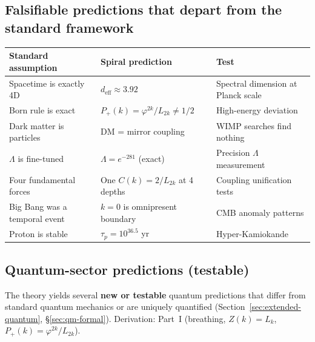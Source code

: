\documentclass[12pt,a4paper]{article}
\begin{document}
\subsection{Falsifiable predictions that depart from the standard framework}

\begin{center}\small
\begin{tabular}{|p{3.4cm}|p{4.2cm}|p{3.6cm}|}
\hline
\textbf{Standard assumption} & \textbf{Spiral prediction} & \textbf{Test} \\
\hline
Spacetime is exactly 4D & $d_{\mathrm{eff}} \approx 3.92$ & Spectral dimension at Planck scale \\
Born rule is exact & $P_+(k) = \varphi^{2k}/L_{2k} \neq 1/2$ & High-energy deviation \\
Dark matter is particles & DM = mirror coupling & WIMP searches find nothing \\
$\Lambda$ is fine-tuned & $\Lambda = e^{-281}$ (exact) & Precision $\Lambda$ measurement \\
Four fundamental forces & One $C(k)=2/L_{2k}$ at 4 depths & Coupling unification tests \\
Big Bang was a temporal event & $k=0$ is omnipresent boundary & CMB anomaly patterns \\
Proton is stable & $\tau_p = 10^{36.5}$ yr & Hyper-Kamiokande \\
\hline
\end{tabular}
\end{center}

\subsection{Quantum-sector predictions (testable)}
\label{sec:quantum-predictions}

The theory yields several \textbf{new or testable} quantum predictions that differ from standard quantum mechanics or are uniquely quantified (Section~\ref{sec:extended-quantum}, \S\ref{sec:qm-formal}). Derivation: Part~I (breathing, $Z(k)=L_k$, $P_+(k)=\varphi^{2k}/L_{2k}$).
\end{document}
